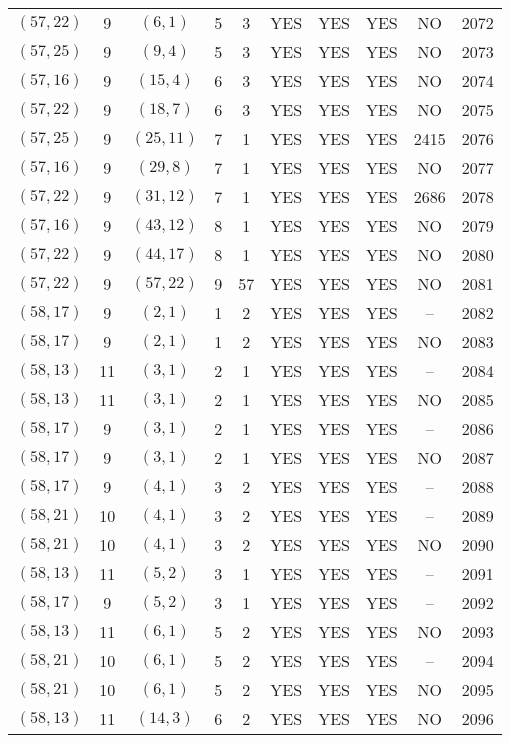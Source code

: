 \begin{longtable}{|c|c|c|c|c|c|c|c|c|c|}
$(57, 22)$ & 9 & $(6, 1)$ & 5 & 3 & YES & YES & YES & NO & 2072\\
$(57, 25)$ & 9 & $(9, 4)$ & 5 & 3 & YES & YES & YES & NO & 2073\\
$(57, 16)$ & 9 & $(15, 4)$ & 6 & 3 & YES & YES & YES & NO & 2074\\
$(57, 22)$ & 9 & $(18, 7)$ & 6 & 3 & YES & YES & YES & NO & 2075\\
$(57, 25)$ & 9 & $(25, 11)$ & 7 & 1 & YES & YES & YES & 2415 & 2076\\
$(57, 16)$ & 9 & $(29, 8)$ & 7 & 1 & YES & YES & YES & NO & 2077\\
$(57, 22)$ & 9 & $(31, 12)$ & 7 & 1 & YES & YES & YES & 2686 & 2078\\
$(57, 16)$ & 9 & $(43, 12)$ & 8 & 1 & YES & YES & YES & NO & 2079\\
$(57, 22)$ & 9 & $(44, 17)$ & 8 & 1 & YES & YES & YES & NO & 2080\\
$(57, 22)$ & 9 & $(57, 22)$ & 9 & 57 & YES & YES & YES & NO & 2081\\
$(58, 17)$ & 9 & $(2, 1)$ & 1 & 2 & YES & YES & YES & -- & 2082\\
$(58, 17)$ & 9 & $(2, 1)$ & 1 & 2 & YES & YES & YES & NO & 2083\\
$(58, 13)$ & 11 & $(3, 1)$ & 2 & 1 & YES & YES & YES & -- & 2084\\
$(58, 13)$ & 11 & $(3, 1)$ & 2 & 1 & YES & YES & YES & NO & 2085\\
$(58, 17)$ & 9 & $(3, 1)$ & 2 & 1 & YES & YES & YES & -- & 2086\\
$(58, 17)$ & 9 & $(3, 1)$ & 2 & 1 & YES & YES & YES & NO & 2087\\
$(58, 17)$ & 9 & $(4, 1)$ & 3 & 2 & YES & YES & YES & -- & 2088\\
$(58, 21)$ & 10 & $(4, 1)$ & 3 & 2 & YES & YES & YES & -- & 2089\\
$(58, 21)$ & 10 & $(4, 1)$ & 3 & 2 & YES & YES & YES & NO & 2090\\
$(58, 13)$ & 11 & $(5, 2)$ & 3 & 1 & YES & YES & YES & -- & 2091\\
$(58, 17)$ & 9 & $(5, 2)$ & 3 & 1 & YES & YES & YES & -- & 2092\\
$(58, 13)$ & 11 & $(6, 1)$ & 5 & 2 & YES & YES & YES & NO & 2093\\
$(58, 21)$ & 10 & $(6, 1)$ & 5 & 2 & YES & YES & YES & -- & 2094\\
$(58, 21)$ & 10 & $(6, 1)$ & 5 & 2 & YES & YES & YES & NO & 2095\\
$(58, 13)$ & 11 & $(14, 3)$ & 6 & 2 & YES & YES & YES & NO & 2096\\

\end{longtable}
